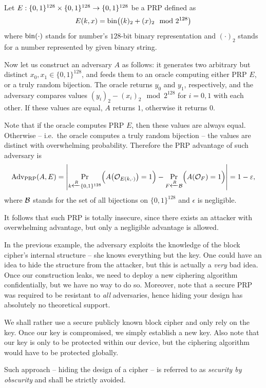 \begin{example}
	Let $E:\{0,1\}^{128}\times\{0,1\}^{128}\rightarrow\{0,1\}^{128}$ be a PRP defined as
	\[
		E(k,x) = \operatorname*{bin}\bigl((k)_2 + (x)_2\mod{2^{128}}\bigr)
	\]
	where $\operatorname*{bin}(\cdot)$ stands for number's $128$-bit binary representation and $(\cdot)_2$ stands for a number represented by given binary string.
	
	Now let us construct an adversary $A$ as follows: it generates two arbitrary but distinct $x_0,x_1\in\{0,1\}^{128}$, and feeds them to an oracle computing either PRP $E$, or a truly random bijection. The oracle returns $y_0$ and $y_1$, respectively, and the adversary compares values $(y_i)_2 - (x_i)_2 \mod{2^{128}}$ for $i=0,1$ with each other. If these values are equal, $A$ returns $1$, otherwise it returns $0$.
	
	Note that if the oracle computes PRP $E$, then these values are always equal. Otherwise -- i.e.\ the oracle computes a truly random bijection -- the values are distinct with overwhelming probability. Therefore the PRP advantage of such adversary is
	\[
		\operatorname*{Adv_{PRP}}(A,E) = \left| \Pr\limits_{k\xleftarrow{R} \{0,1\}^{128}}\Bigl(A\bigl({\cal O}_{E(k,\cdot)}\bigr)=1\Bigr) - \Pr\limits_{F\xleftarrow{R} {\cal B}}\Bigl(A({\cal O}_F)=1\Bigr) \right| = 1 - \varepsilon ,
	\]
	where $\cal B$ stands for the set of all bijections on $\{0,1\}^{128}$ and $\epsilon$ is negligible.
	
	It follows that such PRP is totally insecure, since there exists an attacker with overwhelming advantage, but only a negligible advantage is allowed.
\end{example}

\begin{note}   %
\label{note:secbyobsc}
	In the previous example, the adversary exploits the knowledge of the block cipher's internal structure -- she knows everything but the key. One could have an idea to hide the structure from the attacker, but this is actually a {\em very} bad idea. Once our construction leaks, we need to deploy a new ciphering algorithm confidentially, but we have no way to do so. Moreover, note that a secure PRP was required to be resistant to {\em all} adversaries, hence hiding your design has absolutely no theoretical support.
	
	We shall rather use a secure publicly known block cipher and only rely on the key. Once our key is compromised, we simply establish a new key. Also note that our key is only to be protected within our device, but the ciphering algorithm would have to be protected globally.
	
	Such approach -- hiding the design of a cipher -- is referred to as {\em security by obscurity} and shall be strictly avoided.
\end{note}

